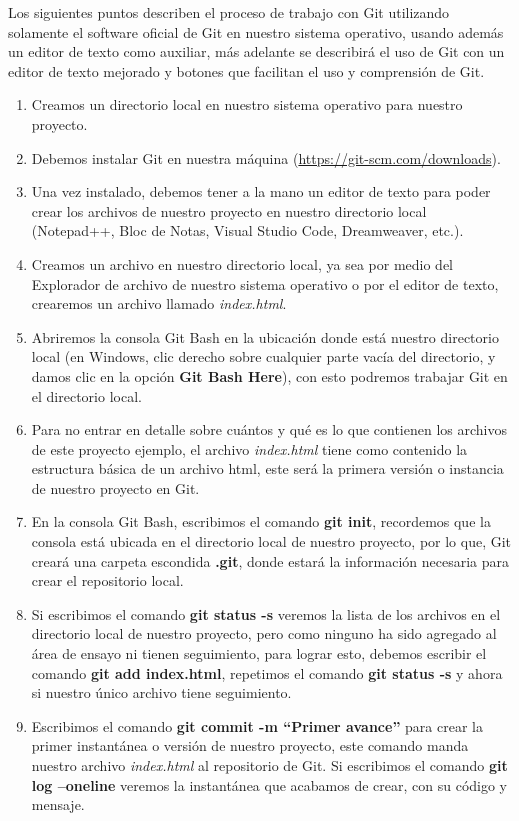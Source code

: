 Los siguientes puntos describen el proceso de trabajo con Git utilizando solamente el software oficial de Git en nuestro sistema operativo, usando además un editor de texto como auxiliar, más adelante se describirá el uso de Git con un editor de texto mejorado y botones que facilitan el uso y comprensión de Git.
\begin{enumerate}
    \item Creamos un directorio local en nuestro sistema operativo para nuestro proyecto.
    \item Debemos instalar Git en nuestra máquina (\underline{https://git-scm.com/downloads}).
    \item Una vez instalado, debemos tener a la mano un editor de texto para poder crear los archivos de nuestro proyecto en nuestro directorio local (Notepad++, Bloc de Notas, Visual Studio Code, Dreamweaver, etc.).
    \item Creamos un archivo en nuestro directorio local, ya sea por medio del Explorador de archivo de nuestro sistema operativo o por el editor de texto, crearemos un archivo llamado \textit{index.html}.
    \item Abriremos la consola Git Bash en la ubicación donde está nuestro directorio local (en Windows, clic derecho sobre cualquier parte vacía del directorio, y damos clic en la opción \textbf{Git Bash Here}), con esto podremos trabajar Git en el directorio local.
    \item Para no entrar en detalle sobre cuántos y qué es lo que contienen los archivos de este proyecto ejemplo, el archivo \textit{index.html} tiene como contenido la estructura básica de un archivo html, este será la primera versión o instancia de nuestro proyecto en Git.
    \item En la consola Git Bash, escribimos el comando \textbf{git init}, recordemos que la consola está ubicada en el directorio local de nuestro proyecto, por lo que, Git creará una carpeta escondida \textbf{.git}, donde estará la información necesaria para crear el repositorio local.
    \item Si escribimos el comando \textbf{git status -s} veremos la lista de los archivos en el directorio local de nuestro proyecto, pero como ninguno ha sido agregado al área de ensayo ni tienen seguimiento, para lograr esto, debemos escribir el comando \textbf{git add index.html}, repetimos el comando \textbf{git status -s} y ahora si nuestro único archivo tiene seguimiento.
    \item Escribimos el comando \textbf{git commit -m “Primer avance”} para crear la primer instantánea o versión de nuestro proyecto, este comando manda nuestro archivo \textit{index.html} al repositorio de Git. Si escribimos el comando \textbf{git log –oneline} veremos la instantánea que acabamos de crear, con su código y mensaje.

\end{enumerate}
